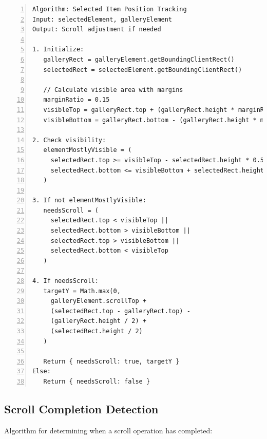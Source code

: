\documentclass[10pt]{article}
\begin{document}
\begin{Verbatim}[frame=lines, numbers=left, tabsize=2, fontsize=\small, xleftmargin=1em, xrightmargin=1em, breaklines=true]
Algorithm: Selected Item Position Tracking
Input: selectedElement, galleryElement
Output: Scroll adjustment if needed

1. Initialize:
   galleryRect = galleryElement.getBoundingClientRect()
   selectedRect = selectedElement.getBoundingClientRect()
   
   // Calculate visible area with margins
   marginRatio = 0.15
   visibleTop = galleryRect.top + (galleryRect.height * marginRatio)
   visibleBottom = galleryRect.bottom - (galleryRect.height * marginRatio)

2. Check visibility:
   elementMostlyVisible = (
     selectedRect.top >= visibleTop - selectedRect.height * 0.5 &&
     selectedRect.bottom <= visibleBottom + selectedRect.height * 0.5
   )

3. If not elementMostlyVisible:
   needsScroll = (
     selectedRect.top < visibleTop ||
     selectedRect.bottom > visibleBottom ||
     selectedRect.top > visibleBottom ||
     selectedRect.bottom < visibleTop
   )

4. If needsScroll:
   targetY = Math.max(0,
     galleryElement.scrollTop +
     (selectedRect.top - galleryRect.top) -
     (galleryRect.height / 2) +
     (selectedRect.height / 2)
   )
   
   Return { needsScroll: true, targetY }
Else:
   Return { needsScroll: false }
\end{Verbatim}

\subsection{Scroll Completion Detection}

Algorithm for determining when a scroll operation has completed:
\end{document}
